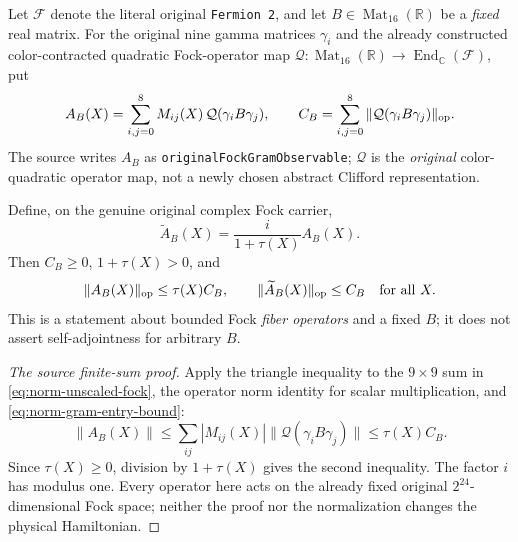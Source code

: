 Let $\mathcal F$ denote the literal original \texttt{Fermion 2}, and let
$B\in\operatorname{Mat}_{16}(\mathbb R)$ be a \emph{fixed} real matrix.
For the original nine gamma matrices $\gamma_i$ and the already
constructed color-contracted quadratic Fock-operator map
$\mathcal Q:\operatorname{Mat}_{16}(\mathbb R)\to\operatorname{End}_{\mathbb C}(\mathcal F)$,
put
\begin{equation}\label{eq:norm-unscaled-fock}
 A_B(X)=\sum_{i,j=0}^{8}M_{ij}(X)\,\mathcal Q(\gamma_iB\gamma_j),
 \qquad
 C_B=\sum_{i,j=0}^{8}\|\mathcal Q(\gamma_iB\gamma_j)\|_{\rm op}.
\end{equation}
The source writes $A_B$ as \texttt{originalFockGramObservable};
$\mathcal Q$ is the \emph{original} color-quadratic operator map,
not a newly chosen abstract Clifford representation.

\begin{theorem}\label{thm:norm-field}
Define, on the genuine original complex Fock carrier,
\begin{equation}\label{eq:norm-field}
 \widetilde A_B(X)=\frac{i}{1+\tau(X)}A_B(X).
\end{equation}
Then $C_B\ge0$, $1+\tau(X)>0$, and
\begin{equation}\label{eq:norm-field-bound}
  \|A_B(X)\|_{\rm op}\le\tau(X)C_B,
 \qquad \|\widetilde A_B(X)\|_{\rm op}\le C_B
 \quad\text{for all }X.
\end{equation}
This is a statement about bounded Fock \emph{fiber operators} and a
fixed $B$; it does not assert self-adjointness for arbitrary $B$.
\end{theorem}
\begin{proof}[The source finite-sum proof]
Apply the triangle inequality to the $9\times9$ sum in
\eqref{eq:norm-unscaled-fock}, the operator norm identity for scalar
multiplication, and \eqref{eq:norm-gram-entry-bound}:
\[
  \|A_B(X)\|\le\sum_{ij}|M_{ij}(X)|
  \|\mathcal Q(\gamma_iB\gamma_j)\|
  \le\tau(X)C_B.
\]
Since $\tau(X)\ge0$, division by $1+\tau(X)$ gives the second
inequality. The factor $i$ has modulus one. Every operator here acts
on the already fixed original $2^{24}$-dimensional Fock space; neither
the proof nor the normalization changes the physical Hamiltonian.
\end{proof}

